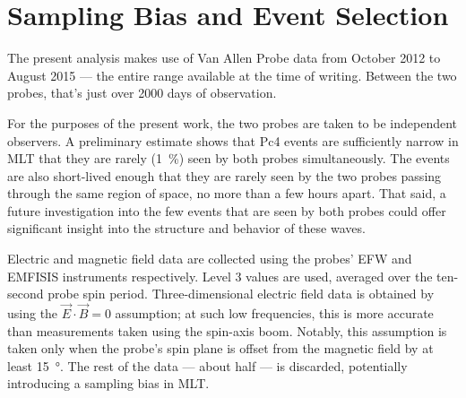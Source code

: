 \section{Sampling Bias and Event Selection}
  \label{sec_selection}

The present analysis makes use of Van Allen Probe data from October 2012 to
August 2015 --- the entire range available at the time of writing. Between the
two probes, that's just over 2000 days of observation. 

For the purposes of the present work, the two probes are taken to be
independent observers. A preliminary estimate shows that Pc4 events are
sufficiently narrow in MLT that they are rarely (\about\SI{1}{\percent}) seen
by both probes simultaneously. The events are also short-lived enough that they
are rarely seen by the two probes passing through the same region of space, no
more than a few hours apart. That said, a future investigation into the few
events that are seen by both probes could offer significant insight into the
structure and behavior of these waves. 



Electric and magnetic field data are collected using the probes'
EFW\cite{wygant_2013} and EMFISIS instruments respectively. Level 3 values are
used, averaged over the ten-second probe spin period. Three-dimensional
electric field data is obtained by using the $\vec{E} \cdot \vec{B} = 0$
assumption; at such low frequencies, this is more accurate than measurements
taken using the spin-axis boom. Notably, this assumption is taken only when the
probe's spin plane is offset from the magnetic field by at least
\SI{15}{\degree}. The rest of the data --- about half --- is discarded,
potentially introducing a sampling bias in MLT.

